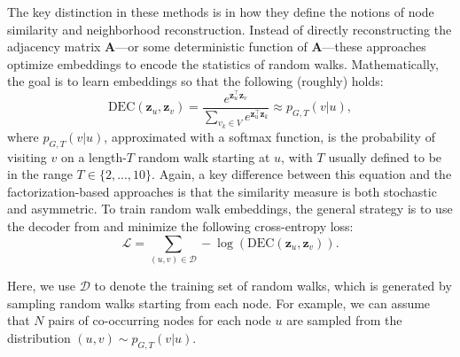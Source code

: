 The key distinction in these methods is in how they define the notions of node similarity and neighborhood reconstruction. Instead of directly reconstructing the adjacency matrix $\mathbf{A}$---or some deterministic function of $\mathbf{A}$---these approaches optimize embeddings to encode the statistics of random walks. Mathematically, the goal is to learn embeddings so that the following (roughly) holds:
\begin{equation}\label{eq:randomWalkdec}
    \text{DEC}(\mathbf{z}_u, \mathbf{z}_v) = \frac{e^{\mathbf{z}_u^\top\mathbf{z}_v}}{\sum_{v_k\in V} e^{\mathbf{z}_u^\top\mathbf{z}_k}} \approx p_{G,T}(v|u),
\end{equation}
where $p_{G,T}(v|u)$, approximated with a softmax function, is the probability of visiting $v$ on a length-$T$ random walk starting at $u$, with $T$ usually defined to be in the range $T\in\{2,...,10\}$. Again, a key difference between this equation and the factorization-based approaches is that the similarity measure is both stochastic and asymmetric.
To train random walk embeddings, the general strategy is to use the decoder from  and minimize the following cross-entropy loss:
\begin{equation}\label{eq:randomWalkloss}
    \mathcal{L} = \sum_{(u,v)\in\mathcal{D}} -\log(\text{DEC}(\mathbf{z}_u, \mathbf{z}_v)).
\end{equation}

Here, we use $\mathcal{D}$ to denote the training set of random walks, which is generated by sampling random walks starting from each node. For example, we can assume that $N$ pairs of co-occurring nodes for each node $u$ are sampled from the distribution $(u,v) \sim p_{G,T}(v|u)$.

